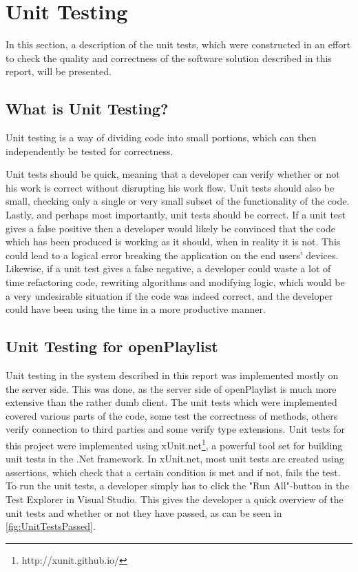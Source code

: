 \section{Unit Testing}
In this section, a description of the unit tests, which were constructed in an effort to check the quality and correctness of the software solution described in this report, will be presented.

\subsection{What is Unit Testing?}
Unit testing is a way of dividing code into small portions, which can then independently be tested for correctness\cite{unittesting}.

Unit tests should be quick, meaning that a developer can verify whether or not his work is correct without disrupting his work flow. Unit tests should also be small, checking only a single or very small subset of the functionality of the code. Lastly, and perhaps most importantly, unit tests should be correct. If a unit test gives a false positive then a developer would likely be convinced that the code which has been produced is working as it should, when in reality it is not. This could lead to a logical error breaking the application on the end users' devices. Likewise, if a unit test gives a false negative, a developer could waste a lot of time refactoring code, rewriting algorithms and modifying logic, which would be a very undesirable situation if the code was indeed correct, and the developer could have been using the time in a more productive manner.


\subsection{Unit Testing for openPlaylist}
Unit testing in the system described in this report was implemented mostly on the server side. This was done, as the server side of openPlaylist is much more extensive than the rather dumb client. 
The unit tests which were implemented covered various parts of the code, some test the correctness of methods, others verify connection to third parties and some verify type extensions.
Unit tests for this project were implemented using xUnit.net\footnote{http://xunit.github.io/}, a powerful tool set for building unit tests in the .Net framework. In xUnit.net, most unit tests are created using assertions, which check that a certain condition is met and if not, fails the test.
To run the unit tests, a developer simply has to click the "Run All"-button in the Test Explorer in Visual Studio. This gives the developer a quick overview of the unit tests and whether or not they have passed, as can be seen in \cref{fig:UnitTestsPassed}.

